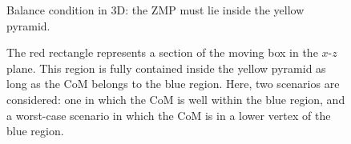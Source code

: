 


\begin{figure}
    \BalanceCondition
    \caption{Balance condition in 3D: the ZMP must lie inside the yellow pyramid.}
    \label{fig:balance3d}
\end{figure}

\begin{figure}
    \ConservativeApprox
    \caption{The red rectangle represents a section of the moving box in the $x$-$z$ plane. This region is fully contained inside the yellow pyramid as long as the CoM belongs to the blue region. Here, two scenarios are considered: one in which the CoM is well within the blue region, and a worst-case scenario in which the CoM is in a lower vertex of the blue region.}
    \label{fig:conservative}
\end{figure}

